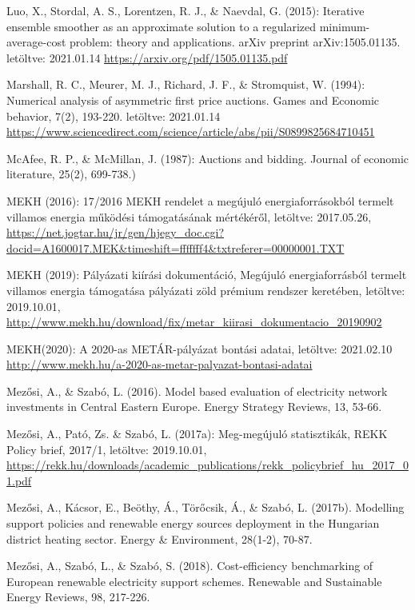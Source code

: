 \documentclass[twoside, magyar, showtrims]{corvinusphd}
\theoremstyle{plain}
\theoremstyle{remark}
\theoremstyle{definition}
\begin{document}
\begin{thebibliography}{99}
Luo, X., Stordal, A. S., Lorentzen, R. J., \& Naevdal, G. (2015): Iterative ensemble smoother as an approximate solution to a regularized minimum-average-cost problem: theory and applications. arXiv preprint arXiv:1505.01135. letöltve: 2021.01.14
\url{https://arxiv.org/pdf/1505.01135.pdf}

Marshall, R. C., Meurer, M. J., Richard, J. F., \& Stromquist, W. (1994): Numerical analysis of asymmetric first price auctions. Games and Economic behavior, 7(2), 193-220.
letöltve: 2021.01.14
\url{https://www.sciencedirect.com/science/article/abs/pii/S0899825684710451}

McAfee, R. P., \& McMillan, J. (1987): Auctions and bidding. Journal of economic literature, 25(2), 699-738.)

MEKH (2016): 17/2016 MEKH rendelet a megújuló energiaforrásokból termelt villamos energia működési támogatásának mértékéről, letöltve: 2017.05.26,
\url{https://net.jogtar.hu/jr/gen/hjegy\_doc.cgi?docid=A1600017.MEK\&timeshift=fffffff4\&txtreferer=00000001.TXT}

MEKH (2019): Pályázati kiírási dokumentáció, Megújuló energiaforrásból termelt villamos energia támogatása pályázati zöld prémium rendszer keretében, letöltve: 2019.10.01,
\url{http://www.mekh.hu/download/fix/metar\_kiirasi\_dokumentacio\_20190902}

MEKH(2020): A 2020-as METÁR-pályázat bontási adatai, letöltve: 2021.02.10
\url{http://www.mekh.hu/a-2020-as-metar-palyazat-bontasi-adatai}

Mezősi, A., \& Szabó, L. (2016). Model based evaluation of electricity network investments in Central Eastern Europe. Energy Strategy Reviews, 13, 53-66.

Mezősi, A., Pató, Zs. \& Szabó, L. (2017a): Meg-megújuló statisztikák, REKK Policy brief, 2017/1, letöltve: 2019.10.01,
\url{https://rekk.hu/downloads/academic\_publications/rekk\_policybrief\_hu\_2017\_01.pdf}

Mezősi, A., Kácsor, E., Beöthy, Á., Törőcsik, Á., \& Szabó, L. (2017b). Modelling support policies and renewable energy sources deployment in the Hungarian district heating sector. Energy \& Environment, 28(1-2), 70-87.

Mezősi, A., Szabó, L., \& Szabó, S. (2018). Cost-efficiency benchmarking of European renewable electricity support schemes. Renewable and Sustainable Energy Reviews, 98, 217-226.


\end{thebibliography}
\end{document}
